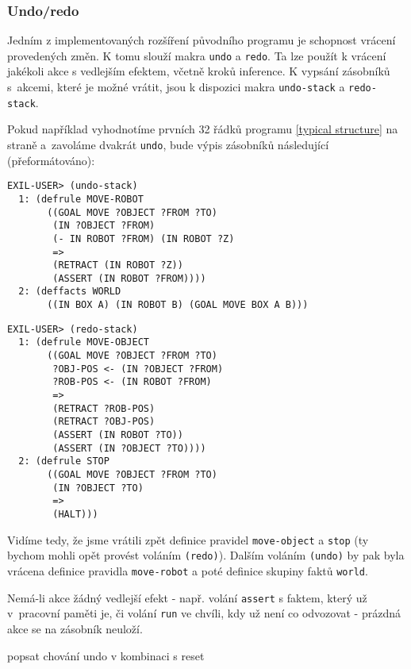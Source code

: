 \subsubsection{Undo/redo}

Jedním z implementovaných rozšíření původního programu je schopnost vrácení
provedených změn. K tomu slouží makra \verb|undo| a \verb|redo|. Ta lze použít k
vrácení jakékoli akce s vedlejším efektem, včetně kroků inference. K vypsání
zásobníků s~akcemi, které je možné vrátit, jsou k dispozici makra
\verb|undo-stack| a \verb|redo-stack|.

Pokud například vyhodnotíme prvních 32 řádků programu \ref{typical structure} na
straně \pageref{typical structure} a~zavoláme dvakrát \verb|undo|, bude výpis
zásobníků následující (přeformátováno):
\begin{verbatim}
EXIL-USER> (undo-stack)
  1: (defrule MOVE-ROBOT
       ((GOAL MOVE ?OBJECT ?FROM ?TO)
        (IN ?OBJECT ?FROM)
        (- IN ROBOT ?FROM) (IN ROBOT ?Z)
        =>
        (RETRACT (IN ROBOT ?Z))
        (ASSERT (IN ROBOT ?FROM))))
  2: (deffacts WORLD
       ((IN BOX A) (IN ROBOT B) (GOAL MOVE BOX A B)))
\end{verbatim}
\begin{verbatim}
EXIL-USER> (redo-stack)
  1: (defrule MOVE-OBJECT
       ((GOAL MOVE ?OBJECT ?FROM ?TO)
        ?OBJ-POS <- (IN ?OBJECT ?FROM)
        ?ROB-POS <- (IN ROBOT ?FROM)
        =>
        (RETRACT ?ROB-POS)
        (RETRACT ?OBJ-POS)
        (ASSERT (IN ROBOT ?TO))
        (ASSERT (IN ?OBJECT ?TO))))
  2: (defrule STOP
       ((GOAL MOVE ?OBJECT ?FROM ?TO)
        (IN ?OBJECT ?TO)
        =>
        (HALT)))
\end{verbatim}
Vidíme tedy, že jsme vrátili zpět definice pravidel \verb|move-object| a
\verb|stop| (ty bychom mohli opět provést voláním \verb|(redo)|). Dalším voláním
\verb|(undo)| by pak byla vrácena definice pravidla \verb|move-robot| a poté
definice skupiny faktů \verb|world|.

Nemá-li akce žádný vedlejší efekt - např. volání \verb|assert| s faktem, který
už v~pracovní paměti je, či volání \verb|run| ve chvíli, kdy už není co
odvozovat - prázdná akce se na zásobník neuloží.

\begin{framed}
popsat chování undo v kombinaci s reset
\end{framed}
